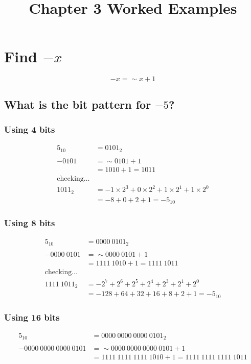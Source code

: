 \documentclass{article}
\begin{document}
\title{Chapter 3 Worked Examples}
\date{}
\maketitle

\section{Find $-x$}

\[-x = \sim x + 1\]

\subsection{What is the bit pattern for $-5$?}

\subsubsection{Using 4 bits}
\begin{align*}
5_{10} &= 0101_2 \\ \\
-0101  &= \sim 0101 + 1 \\
       &= 1010 + 1 = 1011 \\
\mathrm{checking\dots} & \\
1011_2 &= -1 \times 2^3 + 0 \times 2^2 + 1 \times 2^1 + 1 \times 2^0 \\
       &= -8 + 0 + 2 + 1 = -5_{10}
\end{align*}

\subsubsection{Using 8 bits}
\begin{align*}
5_{10} &= 0000\ 0101_2 \\ \\
-0000\ 0101  &= \sim 0000\ 0101 + 1 \\
       &= 1111\ 1010 + 1 = 1111\ 1011 \\
\mathrm{checking\dots} & \\
1111\ 1011_2 &= -2^7 + 2^6 + 2^5 + 2^4 + 2^3 + 2^1 + 2^0 \\
       &= -128 + 64 + 32 + 16 + 8 + 2 + 1 = -5_{10}
\end{align*}

\subsubsection{Using 16 bits}
\begin{align*}
5_{10} &= 0000\ 0000\ 0000\ 0101_2 \\ \\
-0000\ 0000\ 0000\ 0101  &= \sim 0000\ 0000\ 0000\ 0101 + 1 \\
       &= 1111\ 1111\ 1111\ 1010 + 1 = 1111\ 1111\ 1111\ 1011
\end{align*}
\end{document}
